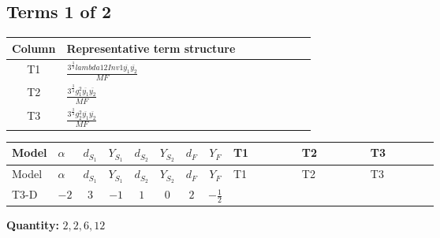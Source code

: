\documentclass[8pt]{article}
\begin{document}
\begin{landscape}
\subsection*{Terms 1 of 2}
\begin{center}
\begin{tabular}{@{}c >{\raggedright\arraybackslash}p{0.82\linewidth}@{}}
\toprule
Column & Representative term structure \\
\midrule
T1 & \(\displaystyle \frac{3^{\frac{3}{4}} lambda12Inv1 \overline{y_{1}} \overline{y_{2}}}{MF}\) \\
\midrule
T2 & \(\displaystyle \frac{3^{\frac{3}{4}} g_{1}^{2} \overline{y_{1}} \overline{y_{2}}}{MF}\) \\
\midrule
T3 & \(\displaystyle \frac{3^{\frac{3}{4}} g_{2}^{2} \overline{y_{1}} \overline{y_{2}}}{MF}\) \\
\midrule
\bottomrule
\end{tabular}
\end{center}
\smallskip
\tiny
\begin{longtable}{@{}llcccccc >{\raggedright\arraybackslash}p{0.21\linewidth} >{\raggedright\arraybackslash}p{0.21\linewidth} >{\raggedright\arraybackslash}p{0.21\linewidth}@{}}
\toprule
Model & $\alpha$ & $d_{S_1}$ & $Y_{S_1}$ & $d_{S_2}$ & $Y_{S_2}$ & $d_F$ & $Y_F$ & T1 & T2 & T3 \\
\midrule
\endfirsthead
\toprule
Model & $\alpha$ & $d_{S_1}$ & $Y_{S_1}$ & $d_{S_2}$ & $Y_{S_2}$ & $d_F$ & $Y_F$ & T1 & T2 & T3 \\
\midrule
\endhead
T3-D & $-2$ & $3$ & $-1$ & $1$ & $0$ & $2$ & $-\frac{1}{2}$ & \scriptsize\adjustbox{max width=\linewidth}{$\begin{gathered} \frac{3^{\frac{3}{4}} lambda12Inv1 \overline{y_{1}} \overline{y_{2}}}{6 MF}\end{gathered}$} & \scriptsize\adjustbox{max width=\linewidth}{$\begin{gathered} \frac{3^{\frac{3}{4}} g_{1}^{2} \overline{y_{1}} \overline{y_{2}}}{8 MF}\end{gathered}$} & \scriptsize\adjustbox{max width=\linewidth}{$\begin{gathered} \frac{11 \cdot 3^{\frac{3}{4}} g_{2}^{2} \overline{y_{1}} \overline{y_{2}}}{8 MF}\end{gathered}$} \\
\midrule
\bottomrule
\end{longtable}
\clearpage
\noindent\textbf{Quantity: }$\mathrm{2,2,6,12}$\par\smallskip

\end{landscape}
\end{document}
